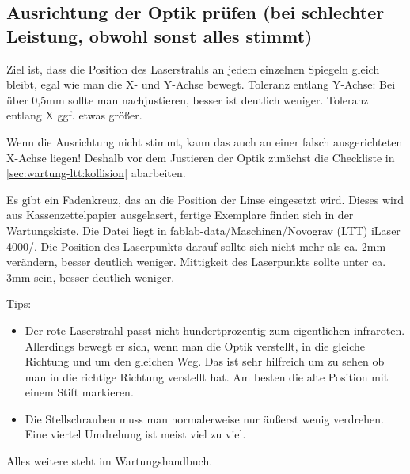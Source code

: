 \documentclass{\basedir/fablab-document}
\begin{document}
\subsection{Ausrichtung der Optik prüfen (bei schlechter Leistung, obwohl sonst alles stimmt)}\label{ltt-wartung-optik}
Ziel ist, dass die Position des Laserstrahls an jedem einzelnen Spiegeln gleich bleibt, egal wie man die X- und Y-Achse bewegt. Toleranz entlang Y-Achse: Bei über 0,5mm sollte man nachjustieren, besser ist deutlich weniger. Toleranz entlang X ggf. etwas größer.

Wenn die Ausrichtung nicht stimmt, kann das auch an einer falsch ausgerichteten X-Achse liegen! Deshalb vor dem Justieren der Optik zunächst die Checkliste in \cref{sec:wartung-ltt:kollision} abarbeiten.

Es gibt ein Fadenkreuz, das an die Position der Linse eingesetzt wird. Dieses wird aus Kassenzettelpapier ausgelasert, fertige Exemplare finden sich in der Wartungskiste. Die Datei liegt in fablab-data/Maschinen/Novograv (LTT) iLaser 4000/. Die Position des Laserpunkts darauf sollte sich nicht mehr als ca. 2mm verändern, besser deutlich weniger. Mittigkeit des Laserpunkts sollte unter ca. 3mm sein, besser deutlich weniger.

Tips:
\begin{itemize}
	\item Der rote Laserstrahl passt nicht hundertprozentig zum eigentlichen infraroten. Allerdings bewegt er sich, wenn man die Optik verstellt, in die gleiche Richtung und um den gleichen Weg. Das ist sehr hilfreich um zu sehen ob man in die richtige Richtung verstellt hat. Am besten die alte Position mit einem Stift markieren.

	\item Die Stellschrauben muss man normalerweise nur äußerst wenig verdrehen. Eine viertel Umdrehung ist meist viel zu viel.
\end{itemize}

Alles weitere steht im Wartungshandbuch.
\end{document}
